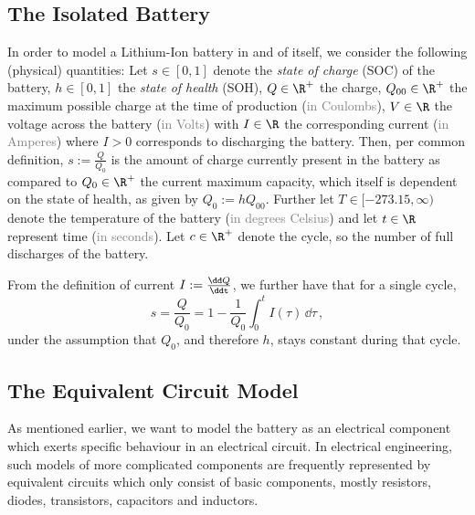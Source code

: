 \documentclass{prettytex/ox/mmsc-special-topic}
\begin{document}
  \subsection{The Isolated Battery}
  In order to model a Lithium-Ion battery in and of itself, we consider the following (physical) quantities:
  Let
  $s \in [0, 1]$ denote the \textit{state of charge} (SOC) of the battery,
  $h \in [0, 1]$ the \textit{state of health} (SOH),
  $Q \in \R^+$ the charge,
  $Q_{00} \in \R^+$ the maximum possible charge at the time of production (\textcolor{gray}{in Coulombs}),
  $V \in \R$ the voltage across the battery (\textcolor{gray}{in Volts}) with
  $I \in \R$ the corresponding current (\textcolor{gray}{in Amperes}) where $I > 0$ corresponds to discharging the battery.
  Then, per common definition, $s := \frac{Q}{Q_0}$ is the amount of charge currently present in the battery as compared to $Q_0 \in \R^+$ the current maximum capacity, which itself is dependent on the state of health, as given by $Q_0 := h Q_{00}$.
  Further let
  $T \in [-273.15, \infty)$ denote the temperature of the battery (\textcolor{gray}{in degrees Celsius}) and
  let $t \in \R$ represent time (\textcolor{gray}{in seconds}).
  Let $c \in \R^+$ denote the cycle, so the number of full discharges of the battery.

  From the definition of current $I := \frac{\dd Q}{\ddt}$, we further have that for a single cycle,
  $$s = \frac{Q}{Q_0} = 1 - \frac{1}{Q_0} \int_0^t I(\tau) \,\dd\tau \,,$$
  under the assumption that $Q_0$, and therefore $h$, stays constant during that cycle.

  \subsection{The Equivalent Circuit Model}
  As mentioned earlier, we want to model the battery as an electrical component which exerts specific behaviour in an electrical circuit.
  In electrical engineering, such models of more complicated components are frequently represented by equivalent circuits which only consist of basic components, mostly resistors, diodes, transistors, capacitors and inductors.
\end{document}
